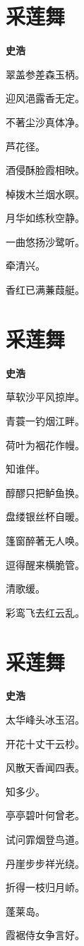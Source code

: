 \documentclass[12pt,a4paper]{ctexbook}
\begin{document}
\section{采莲舞}
\textbf{史浩}\par\vspace{0.5em}
翠盖参差森玉柄。\par
迎风浥露香无定。\par
不著尘沙真体净。\par
芦花径。\par
酒侵酥脸霞相映。\par
棹拨木兰烟水暝。\par
月华如练秋空静。\par
一曲悠扬沙鹭听。\par
牵清兴。\par
香红已满蒹葭艇。\par

\section{采莲舞}
\textbf{史浩}\par\vspace{0.5em}
草软沙平风掠岸。\par
青蓑一钓烟江畔。\par
荷叶为裀花作幔。\par
知谁伴。\par
醇醪只把鲈鱼换。\par
盘缕银丝杯自暖。\par
篷窗醉著无人唤。\par
逗得醒来横脆管。\par
清歌缓。\par
彩鸾飞去红云乱。\par

\section{采莲舞}
\textbf{史浩}\par\vspace{0.5em}
太华峰头冰玉沼。\par
开花十丈干云杪。\par
风散天香闻四表。\par
知多少。\par
亭亭碧叶何曾老。\par
试问霏烟登鸟道。\par
丹崖步步祥光绕。\par
折得一枝归月峤。\par
蓬莱岛。\par
霞裾侍女争言好。\par
\end{document}
